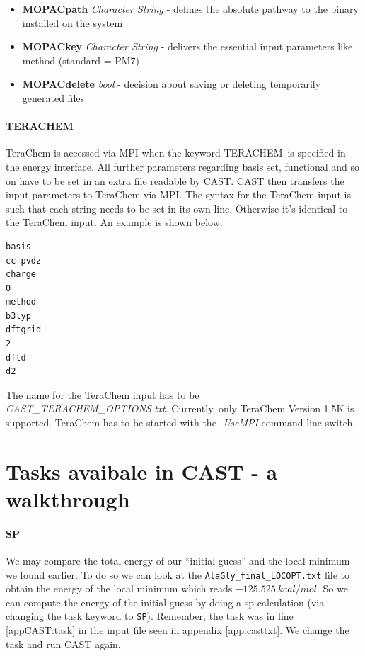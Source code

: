 \documentclass[a4paper,11pt]{scrartcl}
\begin{document}
\begin{itemize}
\item \textbf{MOPACpath} \textit{Character String} - defines the absolute pathway to the binary installed on the system 

\item \textbf{MOPACkey} \textit{Character String} - delivers the essential input parameters like method (standard = PM7)

\item \textbf{MOPACdelete} \textit{bool} - decision about saving or deleting temporarily generated files

\end{itemize}

\paragraph{TERACHEM}

TeraChem is accessed via MPI when the keyword \glqq TERACHEM\grqq~is specified in the energy interface. All further parameters regarding basis set, functional and so on have to be set in an extra file readable by CAST. CAST then transfers the input parameters to TeraChem via MPI. The syntax for the TeraChem input is such that each string needs to be set in its own line. Otherwise it's identical to the TeraChem input. An example is shown below:
		
\begin{lstlisting}[frame=single,]
basis
cc-pvdz
charge
0
method
b3lyp
dftgrid
2
dftd
d2\end{lstlisting}

The name for the TeraChem input has to be \glqq \textit{CAST\_TERACHEM\_OPTIONS.txt}\grqq.
Currently, only TeraChem Version 1.5K is supported. TeraChem has to be started with the \textit{-UseMPI} command line switch.

\newpage

\section{Tasks avaibale in CAST - a walkthrough}

\paragraph{SP}We may compare the total energy of our ``initial guess'' and the local minimum we found earlier. To do so we can look at the \texttt{AlaGly\_final\_LOCOPT.txt} file to obtain the energy of the local minimum which reads $-125.525~kcal/mol$. So we can compute the energy of the initial guess by doing a \ac{sp} calculation (via changing the task keyword to \texttt{SP}). Remember, the task was in line \ref{appCAST:task} in the input file seen in appendix \ref{app:casttxt}. We change the task and run CAST again.
\end{document}
